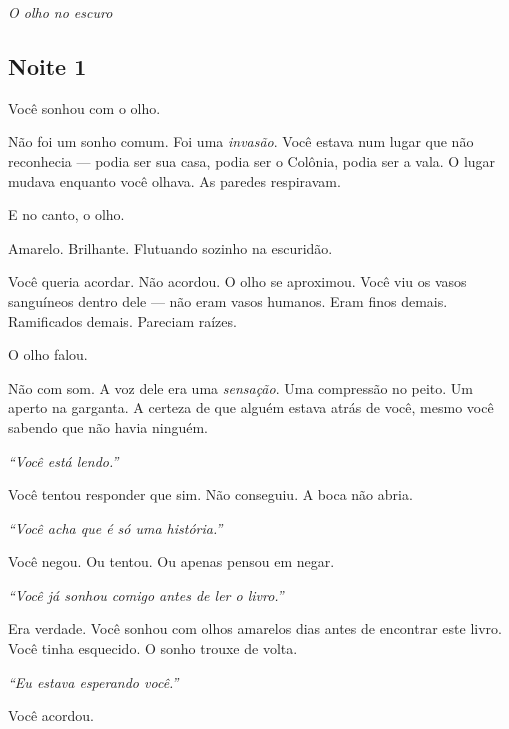 
\noindent \textit{O olho no escuro}

\subsection*{Noite 1}

\noindent Você sonhou com o olho.

\noindent Não foi um sonho comum. Foi uma \textit{invasão}. Você estava num lugar que não reconhecia --- podia ser sua casa, podia ser o Colônia, podia ser a vala. O lugar mudava enquanto você olhava. As paredes respiravam.

\noindent E no canto, o olho.

\noindent Amarelo. Brilhante. Flutuando sozinho na escuridão.

\noindent Você queria acordar. Não acordou. O olho se aproximou. Você viu os vasos sanguíneos dentro dele --- não eram vasos humanos. Eram finos demais. Ramificados demais. Pareciam raízes.

\noindent O olho falou.

\noindent Não com som. A voz dele era uma \textit{sensação}. Uma compressão no peito. Um aperto na garganta. A certeza de que alguém estava atrás de você, mesmo você sabendo que não havia ninguém.

\noindent \textit{\textquotedblleft{}Você está lendo.\textquotedblright{}}

\noindent Você tentou responder que sim. Não conseguiu. A boca não abria.

\noindent \textit{\textquotedblleft{}Você acha que é só uma história.\textquotedblright{}}

\noindent Você negou. Ou tentou. Ou apenas pensou em negar.

\noindent \textit{\textquotedblleft{}Você já sonhou comigo antes de ler o livro.\textquotedblright{}}

\noindent Era verdade. Você sonhou com olhos amarelos dias antes de encontrar este livro. Você tinha esquecido. O sonho trouxe de volta.

\noindent \textit{\textquotedblleft{}Eu estava esperando você.\textquotedblright{}}

\noindent Você acordou.

